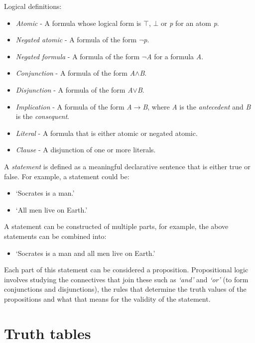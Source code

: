 \documentclass{report}
\begin{document}
Logical definitions:

\begin{itemize}
\item \emph{Atomic} - A formula whose logical form is $\top$, $\bot$ or \textit{p} for an atom \textit{p}.
\item \emph{Negated atomic} - A formula of the form $\neg$\textit{p}.
\item \emph{Negated formula} - A formula of the form $\neg$\textit{A} for a formula \textit{A}.
\item \emph{Conjunction} - A formula of the form \textit{A}$\land$\textit{B}.
\item \emph{Disjunction} - A formula of the form \textit{A}$\lor$\textit{B}.
\item \emph{Implication} - A formula of the form \textit{A}$\to$\textit{B}, where \textit{A} is the \emph{antecedent} and \textit{B} is the \emph{consequent}.
\item \emph{Literal} - A formula that is either atomic or negated atomic.
\item \emph{Clause} - A disjunction of one or more literals.
\end{itemize}

A \textit{statement} is defined as a meaningful declarative sentence that is either true or false. For example, a statement could be: 

\begin{itemize}
\item `Socrates is a man.'
\item `All men live on Earth.'
\end{itemize}
A statement can be constructed of multiple parts, for example, the above statements can be combined into:

\begin{itemize}
\item `Socrates is a man and all men live on Earth.'
\end{itemize}
Each part of this statement can be considered a proposition. Propositional logic involves studying the connectives that join these such as \textit{`and'} and \textit{`or'} (to form conjunctions and disjunctions), the rules that determine the truth values of the propositions and what that means for the validity of the statement.

\section{Truth tables}
\end{document}
